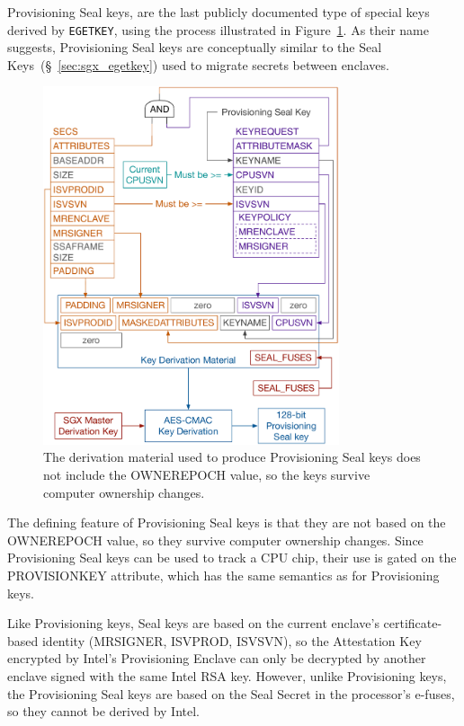 Provisioning Seal keys, are the last publicly documented type of special keys
derived by \texttt{EGETKEY}, using the process illustrated in
Figure~\ref{fig:sgx_egetkey_provseal}. As their name suggests, Provisioning
Seal keys are conceptually similar to the Seal Keys~(\S~\ref{sec:sgx_egetkey})
used to migrate secrets between enclaves.

\begin{figure}[hbt]
  \centering
  \includegraphics[width=87mm]{figures/sgx_egetkey_provseal.pdf}
  \caption{
    The derivation material used to produce Provisioning Seal keys does not
    include the OWNEREPOCH value, so the keys survive computer ownership
    changes.
  }
  \label{fig:sgx_egetkey_provseal}
\end{figure}

The defining feature of Provisioning Seal keys is that they are not based on
the OWNEREPOCH value, so they survive computer ownership changes. Since
Provisioning Seal keys can be used to track a CPU chip, their use is gated on
the PROVISIONKEY attribute, which has the same semantics as for Provisioning
keys.

Like Provisioning keys, Seal keys are based on the current enclave's
certificate-based identity (MRSIGNER, ISVPROD, ISVSVN), so the Attestation Key
encrypted by Intel's Provisioning Enclave can only be decrypted by another
enclave signed with the same Intel RSA key. However, unlike Provisioning keys,
the Provisioning Seal keys are based on the Seal Secret in the processor's
e-fuses, so they cannot be derived by Intel.

